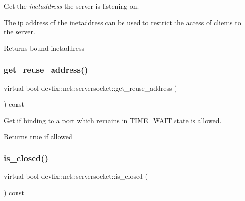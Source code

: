 Get the {\itshape inetaddress} the server is listening on. 

The ip address of the inetaddress can be used to restrict the access of clients to the server. \begin{DoxyReturn}{Returns}
bound inetaddress 
\end{DoxyReturn}
\mbox{\label{structdevfix_1_1net_1_1serversocket_afb5435c5f70649e8e66c35b3cf907e25}} 
\subsubsection{\texorpdfstring{get\+\_\+reuse\+\_\+address()}{get\_reuse\_address()}}
{\footnotesize\ttfamily virtual bool devfix\+::net\+::serversocket\+::get\+\_\+reuse\+\_\+address (\begin{DoxyParamCaption}{ }\end{DoxyParamCaption}) const\hspace{0.3cm}{\ttfamily [pure virtual]}}



Get if binding to a port which remains in T\+I\+M\+E\+\_\+\+W\+A\+IT state is allowed. 

\begin{DoxyReturn}{Returns}
true if allowed 
\end{DoxyReturn}
\mbox{\label{structdevfix_1_1net_1_1serversocket_a852c0aa25c375834487ffc0e8d818221}} 
\subsubsection{\texorpdfstring{is\+\_\+closed()}{is\_closed()}}
{\footnotesize\ttfamily virtual bool devfix\+::net\+::serversocket\+::is\+\_\+closed (\begin{DoxyParamCaption}{ }\end{DoxyParamCaption}) const\hspace{0.3cm}{\ttfamily [pure virtual]}}




